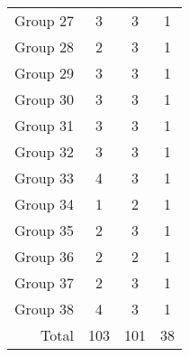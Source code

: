 \begin{table}[H]
\begin{tabular}{@{}rccc@{}}
        Group 27 & 3                                         & 3                                          & 1                                      \\
        Group 28 & 2                                         & 3                                          & 1                                      \\
        Group 29 & 3                                         & 3                                          & 1                                      \\
        Group 30 & 3                                         & 3                                          & 1                                      \\
        Group 31 & 3                                         & 3                                          & 1                                      \\
        Group 32 & 3                                         & 3                                          & 1                                      \\
        Group 33 & 4                                         & 3                                          & 1                                      \\
        Group 34 & 1                                         & 2                                          & 1                                      \\
        Group 35 & 2                                         & 3                                          & 1                                      \\
        Group 36 & 2                                         & 2                                          & 1                                      \\
        Group 37 & 2                                         & 3                                          & 1                                      \\
        Group 38 & 4                                         & 3                                          & 1                                      \\ \midrule
        Total    & 103                                       & 101                                        & 38                                     \\
        \bottomrule
    \end{tabular}
\end{table}

